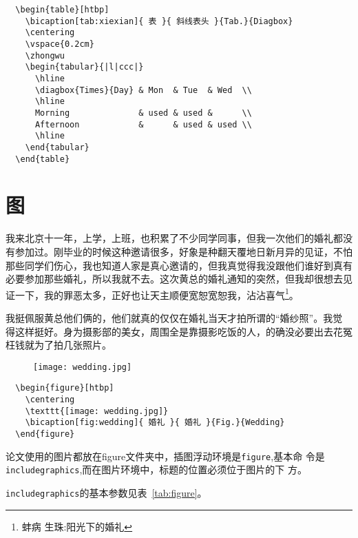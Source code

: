 \begin{lstlisting}
  \begin{table}[htbp]
    \bicaption[tab:xiexian]{ 表 }{ 斜线表头 }{Tab.}{Diagbox}
    \centering
    \vspace{0.2cm}
    \zhongwu
    \begin{tabular}{|l|ccc|}
      \hline
      \diagbox{Times}{Day} & Mon  & Tue  & Wed  \\
      \hline
      Morning              & used & used &      \\
      Afternoon            &      & used & used \\
      \hline
    \end{tabular}
  \end{table}
\end{lstlisting}


\section{图}
\label{chap02:figure}

我来北京十一年，上学，上班，也积累了不少同学同事，但我一次他们的婚礼都没
有参加过。刚毕业的时候这种邀请很多，好象是种翻天覆地日新月异的见证，不怕
那些同学们伤心，我也知道人家是真心邀请的，但我真觉得我没跟他们谁好到真有
必要参加那些婚礼，所以我就不去。这次黄总的婚礼通知的突然，但我却很想去见
证一下，我的罪恶太多，正好也让天主顺便宽恕宽恕我，沾沾喜气\footnote{蚌病
  生珠:阳光下的婚礼}。

我挺佩服黄总他们俩的，他们就真的仅仅在婚礼当天才拍所谓的“婚纱照”。我觉
得这样挺好。身为摄影部的美女，周围全是靠摄影吃饭的人，的确没必要出去花冤
枉钱就为了拍几张照片。

\begin{figure}[htbp]
  \centering
  \texttt{[image: wedding.jpg]}
\end{figure}

\begin{lstlisting}
  \begin{figure}[htbp]
    \centering
    \texttt{[image: wedding.jpg]}
    \bicaption[fig:wedding]{ 婚礼 }{ 婚礼 }{Fig.}{Wedding}
  \end{figure}
\end{lstlisting}

论文使用的图片都放在figure文件夹中，插图浮动环境是\texttt{figure},基本命
令是\texttt{includegraphics},而在图片环境中，标题的位置必须位于图片的下
方。

\texttt{includegraphics}的基本参数见表~\ref{tab:figure}。

